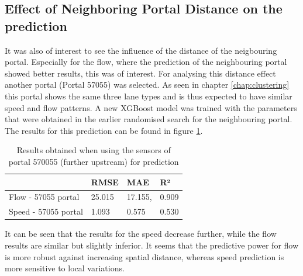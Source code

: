 	\subsection{Effect of Neighboring Portal Distance on the prediction} \label{chap:influencedistance}
	It was also of interest to see the influence of the distance of the neigbouring portal. Especially for the flow, where the prediction of the neighbouring portal showed better results, this was of interest.
	For analysing this distance effect another portal (Portal 57055) was selected. As seen in chapter \ref{chap:clustering} this portal shows the same three lane types and is thus expected to have similar speed and flow patterns. A new XGBoost model was trained with  the parameters that were obtained in the earlier randomised search for the neighbouring portal. The results for this prediction can be found in figure \ref{tab:result_3portal}. 
	\begin{table}[H]
		\centering
		\caption{Results obtained when using the sensors of portal 570055 (further upstream) for prediction}
		\label{tab:result_3portal}
		\begin{tabular}{l|lll}
			& RMSE   & MAE    & R²    \\
			\hline
			Flow - 57055 portal      &25.015& 17.155, &0.909\\
			Speed - 57055 portal     &1.093& 0.575& 0.530\\
		\end{tabular}
	\end{table}
	\noindent It can be seen that the results for the speed decrease further, while the flow results are similar but slightly inferior. It seems that the predictive power for flow is more robust against increasing spatial distance, whereas speed prediction is more sensitive to local variations.
